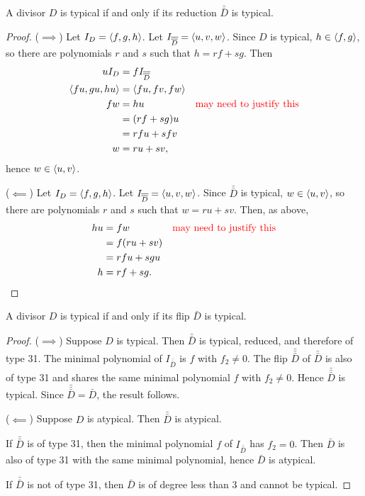 \begin{theorem}
  A divisor $D$ is typical if and only if its reduction $\bar{\bar D}$ is typical.
\end{theorem}
\begin{proof}
  ($\implies$)
  Let $I_D = \left\langle f, g, h \right\rangle$.
  Let $I_{\overline{\overline D}} = \left\langle u, v, w \right\rangle$.
  Since $D$ is typical, $h \in \left\langle f, g \right\rangle$,
  so there are polynomials $r$ and $s$ such that $h = rf + sg$. Then
  \begin{align*}
    uI_D &= fI_{\overline{\overline D}} \\
    \left\langle fu, gu, hu \right\rangle &= \left\langle fu, fv, fw \right\rangle \\
    fw &= hu & \text{{\color{red}may need to justify this}} \\
       &= (rf + sg)u \\
       &= rfu + sfv \\
     w &= ru + sv,
  \end{align*}
  hence $w \in \left\langle u,v \right\rangle$.

  ($\impliedby$)
  Let $I_D = \left\langle f, g, h \right\rangle$.
  Let $I_{\overline{\overline D}} = \left\langle u, v, w \right\rangle$.
  Since $\bar{\bar D}$ is typical, $w \in \left\langle u, v \right\rangle$,
  so there are polynomials $r$ and $s$ such that $w = ru + sv$. Then, as above,
  \begin{align*}
    hu &= fw & \text{{\color{red}may need to justify this}} \\
       &= f(ru + sv) \\
       &= rfu + sgu \\
     h &= rf + sg.
  \end{align*}
\end{proof}

\begin{theorem}
  A divisor $D$ is typical if and only if its flip $\bar D$ is typical.
\end{theorem}
\begin{proof}
  ($\implies$)
  Suppose $D$ is typical.
  Then $\bar{\bar D}$ is typical, reduced, and therefore of type 31.
  The minimal polynomial of $I_{\bar{\bar D}}$ is $f$ with $f_2 \neq 0$.
  The flip $\bar{\bar{\bar D}}$ of $\bar{\bar D}$ is also of type 31
  and shares the same minimal polynomial $f$ with $f_2 \neq 0$.
  Hence $\bar{\bar{\bar D}}$ is typical.
  Since $\bar{\bar{\bar D}} = \bar D$, the result follows.

  ($\impliedby$)
  Suppose $D$ is atypical.
  Then $\bar{\bar D}$ is atypical.
  
  If $\bar{\bar D}$ is of type 31, then the minimal polynomial $f$ of $I_{\bar{\bar D}}$ has $f_2 = 0$.
  Then $\bar D$ is also of type 31 with the same minimal polynomial, hence $\bar D$ is atypical.
  
  If $\bar{\bar D}$ is not of type 31, then $\bar D$ is of degree less than 3 and cannot be typical.
\end{proof}




